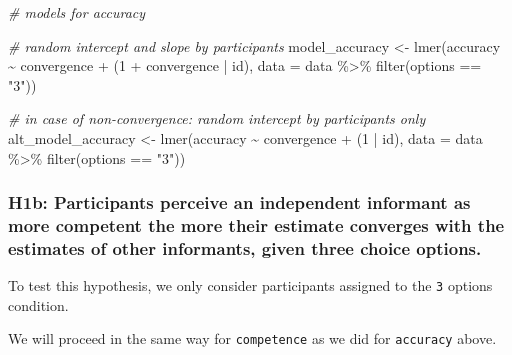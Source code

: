 \documentclass[
]{article}
\newenvironment{Shaded}{\begin{snugshade}}{\end{snugshade}}
\newcommand{\AttributeTok}[1]{\textcolor[rgb]{0.77,0.63,0.00}{#1}}
\newcommand{\CommentTok}[1]{\textcolor[rgb]{0.56,0.35,0.01}{\textit{#1}}}
\newcommand{\DecValTok}[1]{\textcolor[rgb]{0.00,0.00,0.81}{#1}}
\newcommand{\FunctionTok}[1]{\textcolor[rgb]{0.00,0.00,0.00}{#1}}
\newcommand{\NormalTok}[1]{#1}
\newcommand{\OtherTok}[1]{\textcolor[rgb]{0.56,0.35,0.01}{#1}}
\newcommand{\SpecialCharTok}[1]{\textcolor[rgb]{0.00,0.00,0.00}{#1}}
\newcommand{\StringTok}[1]{\textcolor[rgb]{0.31,0.60,0.02}{#1}}
\begin{document}
\begin{Shaded}
\begin{Highlighting}[]
\CommentTok{\# models for accuracy}

\CommentTok{\# random intercept and slope by participants}
\NormalTok{model\_accuracy }\OtherTok{\textless{}{-}} \FunctionTok{lmer}\NormalTok{(accuracy }\SpecialCharTok{\textasciitilde{}}\NormalTok{ convergence }\SpecialCharTok{+}\NormalTok{ (}\DecValTok{1} \SpecialCharTok{+}\NormalTok{ convergence }\SpecialCharTok{|}\NormalTok{ id), }
                       \AttributeTok{data =}\NormalTok{ data }\SpecialCharTok{\%\textgreater{}\%} \FunctionTok{filter}\NormalTok{(options }\SpecialCharTok{==} \StringTok{"3"}\NormalTok{))}

\CommentTok{\# in case of non{-}convergence: random intercept by participants only}
\NormalTok{alt\_model\_accuracy }\OtherTok{\textless{}{-}} \FunctionTok{lmer}\NormalTok{(accuracy }\SpecialCharTok{\textasciitilde{}}\NormalTok{ convergence }\SpecialCharTok{+}\NormalTok{ (}\DecValTok{1} \SpecialCharTok{|}\NormalTok{ id), }
                           \AttributeTok{data =}\NormalTok{ data }\SpecialCharTok{\%\textgreater{}\%} \FunctionTok{filter}\NormalTok{(options }\SpecialCharTok{==} \StringTok{"3"}\NormalTok{))}
\end{Highlighting}
\end{Shaded}

\hypertarget{h1b-participants-perceive-an-independent-informant-as-more-competent-the-more-their-estimate-converges-with-the-estimates-of-other-informants-given-three-choice-options.}{%
\subsubsection{H1b: Participants perceive an independent informant as
more competent the more their estimate converges with the estimates of
other informants, given three choice
options.}\label{h1b-participants-perceive-an-independent-informant-as-more-competent-the-more-their-estimate-converges-with-the-estimates-of-other-informants-given-three-choice-options.}}

To test this hypothesis, we only consider participants assigned to the
\texttt{3} options condition.

We will proceed in the same way for \texttt{competence} as we did for
\texttt{accuracy} above.
\end{document}
